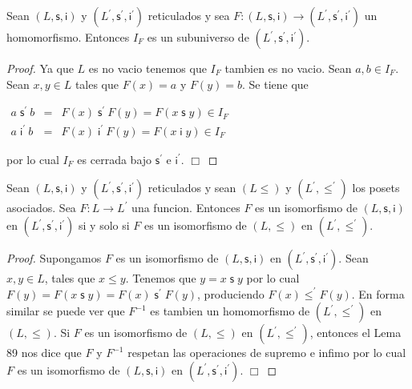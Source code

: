   \begin{lemma}
    Sean \((L,\mathsf{s},\mathsf{i})\) y \((L^{\prime },\mathsf{s}^{\prime }, \mathsf{i}^{\prime })\) reticulados y sea \(F:(L,\mathsf{s},\mathsf{i} )\rightarrow (L^{\prime },\mathsf{s}^{\prime },\mathsf{i}^{\prime })\) un homomorfismo. Entonces \(I_{F}\) es un subuniverso de \((L^{\prime },\mathsf{s} ^{\prime },\mathsf{i}^{\prime })\).
  \end{lemma}
  \begin{proof}
    Ya que \(L\) es no vacio tenemos que \(I_{F}\) tambien es no vacio. Sean \(a,b\in I_{F}\). Sean \(x,y\in L\) tales que \(F(x)=a\) y \(F(y)=b\). Se tiene que

    \(\displaystyle \begin{array}{rcl} a\;\mathsf{s}^{\prime }\ b & =& F(x)\;\mathsf{s}^{\prime }\ F(y)=F(x\mathsf{ \;s\;}y)\in I_{F} \\ a\;\mathsf{i}^{\prime }\ b & =& F(x)\;\mathsf{i}^{\prime }\ F(y)=F(x\mathsf{ \;i\;}y)\in I_{F} \end{array} \)

    por lo cual \(I_{F}\) es cerrada bajo \(\mathsf{s}^{\prime }\) e \(\mathsf{i} ^{\prime }\). \(\Box\)
  \end{proof}

  \begin{lemma}
    Sean \((L,\mathsf{s},\mathsf{i})\) y \((L^{\prime },\mathsf{s}^{\prime }, \mathsf{i}^{\prime })\) reticulados y sean \((L\leq )\) y \((L^{\prime },\leq ^{\prime })\) los posets asociados. Sea \(F:L\rightarrow L^{\prime }\) una funcion. Entonces \(F\) es un isomorfismo de \((L,\mathsf{s},\mathsf{i})\) en \( (L^{\prime },\mathsf{s}^{\prime },\mathsf{i}^{\prime })\) si y solo si \(F\) es un isomorfismo de \((L,\leq )\) en \((L^{\prime },\leq ^{\prime })\).
  \end{lemma}
  \begin{proof}
    Supongamos \(F\) es un isomorfismo de \((L,\mathsf{s},\mathsf{i})\) en \( (L^{\prime },\mathsf{s}^{\prime },\mathsf{i}^{\prime })\). Sean \(x,y\in L\), tales que \(x\leq y\). Tenemos que \(y=x\mathsf{\;s\;}y\) por lo cual \(F(y)=F(x \mathsf{\;s\;}y)=F(x)\mathsf{\;s^{\prime }\;}F(y)\), produciendo \(F(x)\leq ^{\prime }F(y)\). En forma similar se puede ver que \(F^{-1}\) es tambien un homomorfismo de \((L^{\prime },\leq ^{\prime })\) en \((L,\leq )\). Si \(F\) es un isomorfismo de \((L,\leq )\) en \((L^{\prime },\leq ^{\prime })\), entonces el Lema 89 nos dice que \(F\) y \(F^{-1}\) respetan las operaciones de supremo e infimo por lo cual \(F\) es un isomorfismo de \((L,\mathsf{s},\mathsf{ i})\) en \((L^{\prime },\mathsf{s}^{\prime },\mathsf{i}^{\prime })\). \(\Box\)
  \end{proof}

